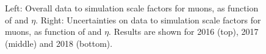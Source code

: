 \begin{figure}[htbp]
\begin{center}
    \caption{Left: Overall data to simulation scale factors for muons, as function of \pt and $\eta$. Right: Uncertainties on  data to simulation scale factors for muons, as function of \pt and $\eta$. Results are shown for 2016 (top), 2017 (middle) and 2018 (bottom).}
    \label{fig:MuonIDEff_5}
\end{center}
\end{figure}

